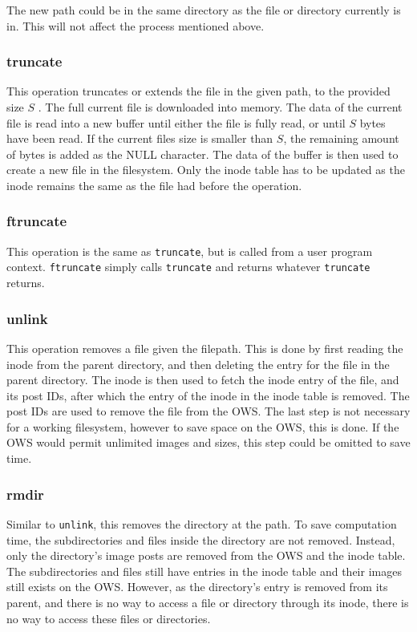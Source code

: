 The new path could be in the same directory as the file or directory currently is in. This will not affect the process mentioned above.

\subsubsection{truncate}
This operation truncates or extends the file in the given path, to the provided size $S$ . The full current file is downloaded into memory. The data of the current file is read into a new buffer until either the file is fully read, or until $S$ bytes have been read. If the current files size is smaller than $S$, the remaining amount of bytes is added as the NULL character. The data of the buffer is then used to create a new file in the filesystem. Only the inode table has to be updated as the inode remains the same as the file had before the operation.

\subsubsection{ftruncate}
This operation is the same as \texttt{truncate}, but is called from a user program context. \texttt{ftruncate} simply calls \texttt{truncate} and returns whatever \texttt{truncate} returns.

\subsubsection{unlink}
This operation removes a file given the filepath. This is done by first reading the inode from the parent directory, and then deleting the entry for the file in the parent directory. The inode is then used to fetch the inode entry of the file, and its post IDs, after which the entry of the inode in the inode table is removed. The post IDs are used to remove the file from the OWS. The last step is not necessary for a working filesystem, however to save space on the OWS, this is done. If the OWS would permit unlimited images and sizes, this step could be omitted to save time.

\subsubsection{rmdir}
Similar to \texttt{unlink}, this removes the directory at the path. To save computation time, the subdirectories and files inside the directory are not removed. Instead, only the directory's image posts are removed from the OWS and the inode table. The subdirectories and files still have entries in the inode table and their images still exists on the OWS. However, as the directory's entry is removed from its parent, and there is no way to access a file or directory through its inode, there is no way to access these files or directories.

